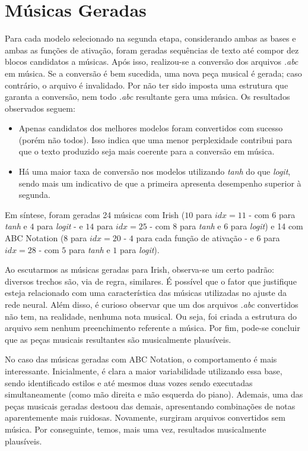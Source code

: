 \documentclass{automatextcc}
\begin{document}
\section{Músicas Geradas}
Para cada modelo selecionado na segunda etapa, considerando ambas as bases e ambas as funções de ativação, foram geradas sequências de texto até compor dez blocos candidatos a músicas. Após isso, realizou-se a conversão dos arquivos \textit{.abc} em música. Se a conversão é bem sucedida, uma nova peça musical é gerada; caso contrário, o arquivo é invalidado. Por não ter sido imposta uma estrutura que garanta a conversão, nem todo \textit{.abc} resultante gera uma música. Os resultados observados seguem:
\begin{itemize}
    \item Apenas candidatos dos melhores modelos foram convertidos com sucesso (porém não todos). Isso indica que uma menor perplexidade contribui para que o texto produzido seja mais coerente para a conversão em música.
    \item Há uma maior taxa de conversão nos modelos utilizando \textit{tanh} do que \textit{logit}, sendo mais um indicativo de que a primeira apresenta desempenho superior à segunda.
\end{itemize}
Em síntese, foram geradas 24 músicas com Irish ($10$ para $idx=11$ - com $6$ para \textit{tanh} e $4$ para \textit{logit} - e $14$ para $idx=25$ - com $8$ para \textit{tanh} e $6$ para \textit{logit}) e 14 com ABC Notation ($8$ para $idx=20$ - $4$ para cada função de ativação - e $6$ para $idx=28$ - com $5$ para \textit{tanh} e $1$ para \textit{logit}).

Ao escutarmos as músicas geradas para Irish, observa-se um certo padrão: diversos trechos são, via de regra, similares. É possível que o fator que justifique esteja relacionado com uma característica das músicas utilizadas no ajuste da rede neural. Além disso, é curioso observar que um dos arquivos \textit{.abc} convertidos não tem, na realidade, nenhuma nota musical. Ou seja, foi criada a estrutura do arquivo sem nenhum preenchimento referente a música. Por fim, pode-se concluir que as peças musicais resultantes são musicalmente plausíveis.

No caso das músicas geradas com ABC Notation, o comportamento é mais interessante. Inicialmente, é clara a maior variabilidade utilizando essa base, sendo identificado estilos e até mesmos duas vozes sendo executadas simultaneamente (como mão direita e mão esquerda do piano). Ademais, uma das peças musicais geradas destoou das demais, apresentando combinações de notas aparentemente mais ruidosas. Novamente, surgiram arquivos convertidos sem música. Por conseguinte, temos, mais uma vez, resultados musicalmente plausíveis.
\end{document}
